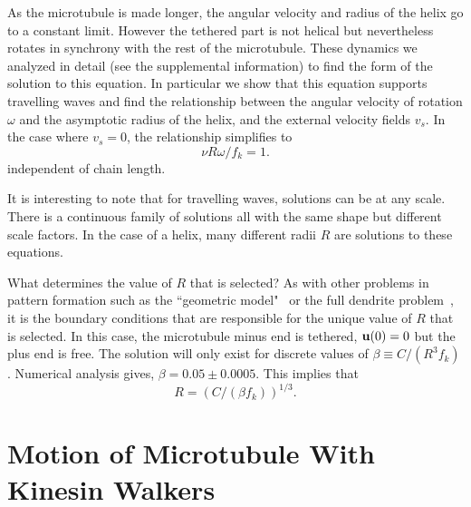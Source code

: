 \documentclass[11pt]{ucthesis}
\def\bu{{\bf u}}
\begin{document}
As the microtubule is made longer, the angular velocity and radius of the helix go to
a constant limit. However the tethered part is not helical but nevertheless rotates
in synchrony with the rest of the microtubule. These dynamics we analyzed in detail
(see the supplemental information) to find the form of the solution to this equation.
In particular we show that this equation supports travelling waves and find the
relationship between the angular velocity of rotation $\omega$ and the asymptotic
radius of the helix, and the external velocity fields $v_s$. In the case where $v_s = 0$, the
relationship simplifies to 
\begin{equation}
\label{eq:Romega}
\nu R \omega/f_k = 1.
\end{equation}
independent of chain length.

It is interesting to note that for travelling waves, solutions can be at any scale. There is a continuous family of solutions
all with the same shape but different scale factors. In the case of a helix, many different radii $R$ are solutions to
these equations.

What determines the value of $R$ that is selected? As with other problems in pattern formation such as the ``geometric model"~\cite{Kessler}
or the full dendrite problem~\cite{Barbieri}, it is the boundary conditions
that are responsible for the unique value of $R$ that is selected. In this case, the microtubule minus end is tethered, $\bu(0) = 0$
but the plus end is free.
The solution will only exist for discrete values
of $\beta \equiv C/(R^3 f_k)$. Numerical analysis gives, $\beta = 0.05 \pm 0.0005$. 
This implies that 
\begin{equation}
\label{eq:R}
R =  (C/(\beta f_k))^{1/3}.
\end{equation}


\section{Motion of Microtubule With Kinesin Walkers}

\end{document}
